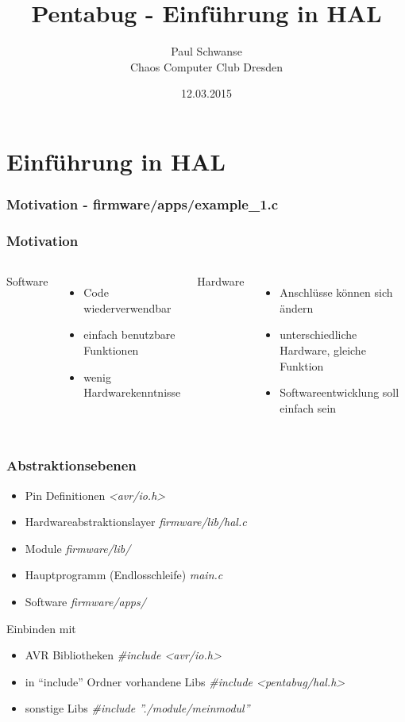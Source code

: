 \documentclass[12pt]{beamer}
\title{Pentabug - Einführung in HAL}
\author{\small Paul Schwanse \\\large Chaos Computer Club Dresden}
\date{12.03.2015}
\begin{document}
\maketitle

\section{Einführung in HAL}

\begin{frame}[fragile]
	\frametitle{Motivation - firmware/apps/example\_1.c}
	
\end{frame}


\begin{frame}
    \frametitle{Motivation}
    \begin{columns}[T]
    Software
    \begin{itemize}
	    \item Code wiederverwendbar
	    \item einfach benutzbare Funktionen
	    \item wenig Hardwarekenntnisse
    \end{itemize}
    Hardware
    \begin{itemize}
    \item Anschlüsse können sich ändern
    \item unterschiedliche Hardware, gleiche Funktion
    \item Softwareentwicklung soll einfach sein
    \end{itemize}
    \end{columns}

\end{frame}
\begin{frame}
    \frametitle{Abstraktionsebenen}
    \begin{itemize}
	    \item {Pin Definitionen \textit{<avr/io.h>}}
	    \item {Hardwareabstraktionslayer \textit{firmware/lib/hal.c}}
	    \item {Module \textit{firmware/lib/}}
	    \item {Hauptprogramm (Endlosschleife) \textit{main.c}}
	    \item {Software \textit{firmware/apps/}}
    \end{itemize}
    Einbinden mit
    \begin{itemize}
	    \item AVR Bibliotheken \textit{\#include <avr/io.h>}
	    \item in ``include'' Ordner vorhandene Libs \textit{\#include <pentabug/hal.h>}
	    \item sonstige Libs \textit{\#include ''./module/meinmodul''}
    \end{itemize}
\end{frame}
\end{document}
